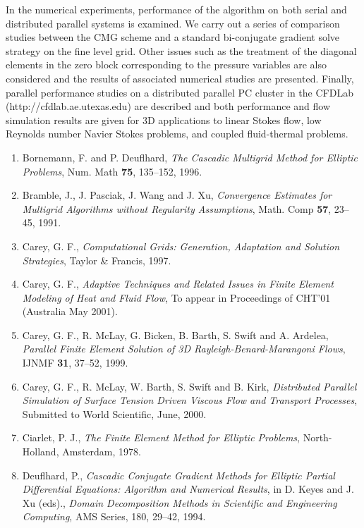 \documentclass[11pt]{article}
\begin{document}
In the numerical experiments, performance of the algorithm on
both serial and distributed parallel systems is examined.  We
carry out a series of comparison studies between the CMG scheme
and a standard bi-conjugate gradient solve strategy on the fine
level grid.  Other issues such as the treatment of the diagonal
elements in the zero block corresponding to the pressure
variables are also considered and the results of associated
numerical studies are presented.  Finally, parallel performance
studies on a distributed parallel PC cluster in the CFDLab
(http://cfdlab.ae.utexas.edu) are described and both performance
and flow simulation results are given for 3D applications to
linear Stokes flow, low Reynolds number Navier Stokes problems,
and coupled fluid-thermal problems.


\begin{enumerate}


\item Bornemann, F. and P. Deuflhard,
{\em The Cascadic Multigrid Method for Elliptic Problems},
Num. Math {\bf 75}, 135--152, 1996.

\item Bramble, J., J. Pasciak, J. Wang and J. Xu,
{\em Convergence Estimates for Multigrid Algorithms
without Regularity Assumptions}, Math. Comp
{\bf 57}, 23--45, 1991.

\item Carey, G. F.,
{\em Computational Grids:  Generation, Adaptation
and Solution Strategies}, Taylor \& Francis, 1997.

\item Carey, G. F.,
{\em Adaptive Techniques and Related Issues in
Finite Element Modeling of Heat and Fluid Flow},
To appear in Proceedings of CHT'01 (Australia May 2001).

\item Carey, G. F., R. McLay, G. Bicken, B. Barth, S. Swift and
A. Ardelea,
{\em Parallel Finite Element Solution of 3D
Rayleigh-Benard-Marangoni Flows}, IJNMF {\bf 31},
37--52, 1999.

\item Carey, G. F., R. McLay, W. Barth, S. Swift and B. Kirk,
{\em Distributed Parallel Simulation of Surface Tension Driven
Viscous Flow and Transport Processes}, Submitted to World
Scientific, June, 2000.

\item Ciarlet, P. J.,
{\em The Finite Element Method for Elliptic Problems},
North-Holland, Amsterdam, 1978.

\item Deuflhard, P.,
{\em Cascadic Conjugate Gradient Methods for
Elliptic Partial Differential Equations: Algorithm and Numerical
Results}, in D. Keyes and J. Xu (eds).,
{\em Domain Decomposition
Methods in Scientific and Engineering Computing},
AMS Series, 180, 29--42, 1994.

\end{enumerate}
\end{document}
